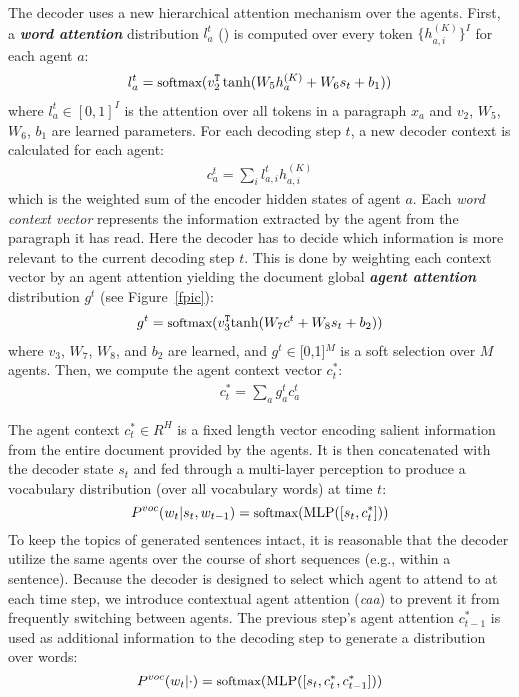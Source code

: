 \documentclass[11pt,a4paper]{article}
\begin{document}
The decoder uses a new hierarchical attention mechanism over the agents. First, 
a \textbf{\textit{word attention}} distribution $l_{a}^t$ (\citet{bahdanau2014neural}) is computed over every token $\{h^{(K)}_{a,i}\}^I$ for each agent $a$:
\begin{align}
l_{a}^t=\textup{\small softmax}(v_2^{\mathtt{T}}\tanh(W_5h^{(K)}_{a} + W_{6}s_t + b_{1}))
\label{attention2}
\end{align}
where $l_{a}^t$$\in$$[0,1]^I$ is the attention over all tokens in a paragraph $x_a$ and $v_2$, $W_5$, $W_{6}$, $b_{1}$ are learned parameters.
For each decoding step $t$, a new decoder context is calculated for each agent:
\begin{align}
c_{a}^t=\sum_i l_{a,i}^th_{a,i}^{(K)}
\label{context}
\end{align}
which is the weighted sum of the encoder hidden states of agent $a$. 
Each \emph{word context vector} represents the information extracted by the agent from the paragraph it has read. 
Here the decoder has to decide which information is more relevant to the current decoding step $t$. This is done by weighting each context vector by an agent attention yielding the document global \textbf{\textit{agent attention}} distribution $g^t$ (see Figure~\ref{fpic}):
\begin{align}
g^t=\textup{\small softmax} (v_3^{\mathtt{T}}\textup{tanh}(W_{7} c^t + W_{8}s_t + b_{2}))
\label{aattention2}
\end{align}
where $v_3$, $W_{7}$, $W_{8}$, and $b_{2}$ are learned, and $g^t\in$[0,1]$^M$ is a soft selection over $M$ agents. 
Then, we compute the agent context vector $c^*_t$:
\begin{align}
c^*_t=\textstyle{\sum_a} g_a^tc_{a}^t
\label{context}
\end{align}

\noindent The agent context $c^*_t$$\in$$R^H$ is a fixed length vector encoding salient information from the entire document provided by the agents. 
It is then concatenated with the decoder state $s_t$ and fed through a multi-layer perception to produce a vocabulary distribution (over all vocabulary words) at time $t$:
\begin{equation}
P^{voc}(w_t \vert s_t, w_{t-1}) =\textup{\small softmax} (\textup{MLP}([s_t,c^*_t]))
\label{vocab}
\end{equation}
To keep the topics of generated sentences intact, it is reasonable that the decoder utilize the same agents over the course of short sequences (e.g., within a sentence).  
Because the decoder is designed to select which agent to attend to at each time step, we introduce contextual agent attention (\textit{caa}) to prevent it from frequently switching between agents. 
The previous step's agent attention $c^*_{t-1}$ is used as additional information to the decoding step to generate a distribution over words:
\begin{equation}
P^{voc}(w_t \vert \cdot) =\textup{\small softmax} (\textup{MLP}([s_t,c^*_t,c^*_{t-1}]))
\label{vocabcaa}
\end{equation}
\end{document}
